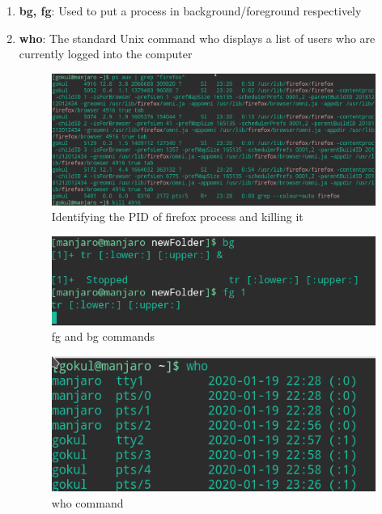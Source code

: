 \documentclass{article}
\begin{document}
\begin{enumerate}
    \item {\bf bg, fg}: Used to put a process in background/foreground respectively\newline
    \item {\bf who}: The standard Unix command who displays a list of users who are currently logged into the computer\newline
    \begin{figure}[h!]
        \centering
        \includegraphics[width=.83\textwidth]{img/p2/ss13.png}
        \caption{Identifying the PID of firefox process and killing it}
    \end{figure}
    \begin{figure}[h!]
        \centering
        \includegraphics[width=.83\textwidth]{img/p2/ss9.png}
        \caption{fg and bg commands}
    \end{figure}
    \begin{figure}[h!]
        \centering
        \includegraphics[width=.83\textwidth]{img/p2/ss12.png}
        \caption{who command}
    \end{figure}
\end{enumerate}
\end{document}
